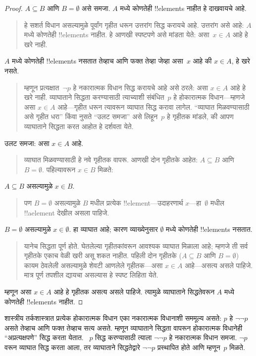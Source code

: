 \documentclass[../../../include/open-logic-section]{subfiles}
\begin{document}
\begin{proof}
$A \subseteq B$ आणि $B = \emptyset$ असे समजा. $A$ मध्ये कोणतेही !!{element}s नाहीत हे दाखवायचे आहे.
\begin{quote}
हे सशर्त विधान असल्यामुळे पूर्वांग गृहीत धरून उत्तरांग सिद्ध करायचे आहे. उत्तरांग असे आहे: $A$ मध्ये कोणतेही !!{element}s नाहीत. हे आणखी स्पष्टपणे असे मांडता येते: असा~$x \in A$ आहे हे खरे नाही.
\end{quote}
$A$ मध्ये कोणतेही !!{element}s नसतात तेव्हाच आणि फक्त तेव्हा जेव्हा असा~$x$ आहे की $x \in A$, हे खरे नसते.
\begin{quote}
म्हणून प्रत्यक्षात~$\lnot p$ हे नकारात्मक विधान सिद्ध करायचे आहे असे ठरले: असा $x \in A$ आहे हे खरे नाही. व्याघाताने सिद्धता करण्यासाठी त्याच्याशी संबंधित~$p$ हे होकारात्मक विधान---म्हणजे असा $x \in A$ आहे---गृहीत धरून त्यावरून व्याघात सिद्ध करावा लागेल. “व्याघात मिळवण्यासाठी असे गृहीत धरा” किंवा नुसते “उलट समजा” असे लिहून~$p$ हे गृहीतक मांडले, की आपण व्याघाताने सिद्धता करत आहोत हे दर्शवता येते.
\end{quote}
उलट समजा: असा $x \in A$ आहे.
\begin{quote}
व्याघात मिळवण्यासाठी हे नवे गृहीतक वापरू. आणखी दोन गृहीतके आहेत: $A \subseteq B$ आणि $B = \emptyset$. पहिल्यावरून $x \in B$ मिळते:
\end{quote}
$A \subseteq B$ असल्यामुळे $x \in B$.
\begin{quote}
पण $B = \emptyset$ असल्यामुळे $B$ मधील प्रत्येक !!{element}---उदाहरणार्थ $x$---हा~$\emptyset$ मधील !!a{element} देखील असला पाहिजे.
\end{quote}
$B = \emptyset$ असल्यामुळे $x \in \emptyset$. हा व्याघात आहे; कारण व्याख्येनुसार $\emptyset$ मध्ये कोणतेही !!{element}s नसतात.
\begin{quote}
यानेच सिद्धता पूर्ण होते. घेतलेल्या गृहीतकांवरून आवश्यक व्याघात मिळाला आहे; म्हणजे ती सर्व गृहीतके एकाच वेळी खरी असू शकत नाहीत. पहिली दोन गृहीतके ($A \subseteq B$ आणि $B = \emptyset$) कायम ठेवलेली असल्यामुळे शेवटी आणलेले गृहीतक---असा $x \in A$ आहे---असत्य असले पाहिजे. मात्र पूर्ण तपशील द्यायचा असल्यास हे स्पष्ट लिहिता येते.
\end{quote}
म्हणून असा $x \in A$ आहे हे गृहीतक असत्य असले पाहिजे. त्यामुळे व्याघाताने सिद्धतेवरून $A$ मध्ये कोणतेही !!{element}s नाहीत.
\end{proof}

शास्त्रीय तर्कशास्त्रात प्रत्येक होकारात्मक विधान एका नकारात्मक विधानाशी सममूल्य असते: $p$ हे $\lnot\lnot p$ असते तेव्हाच आणि फक्त तेव्हाच सत्य असते. म्हणून व्याघाताने सिद्धता वापरून होकारात्मक विधानेही “अप्रत्यक्षपणे” सिद्ध करता येतात. ~$p$ सिद्ध करण्यासाठी त्याला $\lnot\lnot p$ हे नकारात्मक विधान समजा. $\lnot p$ वरून व्याघात सिद्ध करता आला, तर व्याघाताने सिद्धतेद्वारे $\lnot\lnot p$ प्रस्थापित होते आणि म्हणून~$p$ मिळते.
\end{document}
